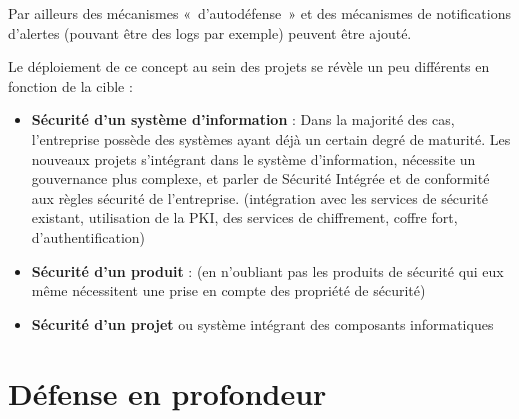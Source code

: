 Par ailleurs des mécanismes « d’autodéfense » et des mécanismes de notifications d’alertes (pouvant être des logs par exemple) peuvent être ajouté.

Le déploiement de ce concept au sein des projets  se révèle un peu différents en fonction de la cible :

\begin{itemize}
	\item  \textbf{Sécurité d’un système d’information} : Dans la majorité des cas, l’entreprise possède des systèmes ayant déjà un certain degré de maturité. Les nouveaux projets s’intégrant dans le système d’information, nécessite un gouvernance plus complexe, et parler de Sécurité Intégrée et de conformité aux règles sécurité de l’entreprise. (intégration avec les services de sécurité existant, utilisation de la PKI, des services de chiffrement, coffre fort, d’authentification)
	\item \textbf{Sécurité d’un produit} : (en n’oubliant pas les produits de sécurité qui eux même nécessitent une prise en compte des propriété de sécurité)
	\item \textbf{Sécurité d’un projet} ou système intégrant des composants informatiques
\end{itemize}

\section{Défense en profondeur}

\utodo

\utocomplete


